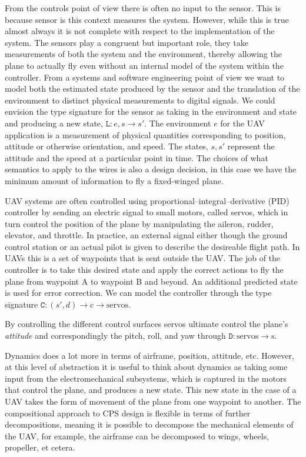\documentclass{article}
\begin{document}
From the controls point of view there is often no input to the sensor.
This is because sensor is this context measures the system.
However, while this is true almost always it is not complete
with respect to the implementation of the system.
The sensors play a congruent but important role,
they take measurements of both the system
and the environment, thereby allowing the plane to actually fly
even without an internal model of the system within the controller.
From a systems and software engineering point of view we want to model both
the estimated state produced by the sensor and the translation
of the environment to distinct physical measurements
to digital signals.
We could envision the type signature for the sensor as
taking in the environment and state and producing a new state,
\(\mathtt{L}: e, s \rightarrow s'\).
The environment \(e\) for the UAV application is a measurement
of physical quantities corresponding to position, attitude or otherwise orientation, and speed.
The states, \(s, s'\) represent the attitude and the speed at a particular point in time.
The choices of what semantics to apply
to the wires is also a design decision, in this case we have the minimum amount
of information to fly a fixed-winged plane.

UAV systems are often controlled using proportional--integral--derivative (PID) controller by sending an electric signal to small motors, called servos, which in turn control the position of the plane by manipulating the aileron, rudder, elevator, and throttle. In practice, an external signal either though the ground control station or an actual pilot is given to describe the desireable flight path. In UAVs this is a set of waypoints that is sent outside the UAV. The job of the controller is to take this desired state and apply the correct actions to fly the plane from waypoint A to waypoint B and beyond. An additional predicted state is used for error correction. We can model the controller through the type signature \(\mathtt{C}: (s', d) \rightarrow \text{c} \rightarrow \text{servos.}\)

By controlling the different control surfaces servos ultimate control the plane's \emph{attitude} and correspondingly the pitch, roll, and yaw through \(\mathtt{D}: \text{servos} \rightarrow \text{s.}\)

Dynamics does a lot more in terms of airframe, position, attitude, etc. However, at this level of abstraction it is useful to think about dynamics as taking some input from the electromechanical subsystems, which is captured in the motors that control the plane, and produces a new state.
This new state in the case of a UAV takes the form of movement of the plane from one waypoint to another.
The compositional approach to CPS design is flexible in terms of further decompositions, meaning it is possible to decompose the mechanical elements of the UAV, for example, the airframe can be decomposed to wings, wheels, propeller, et cetera.
\end{document}
